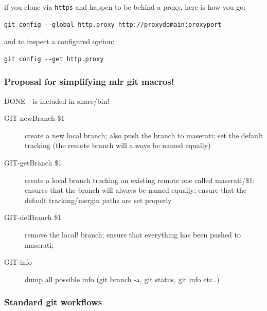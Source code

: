\begin{itemize}
if you clone via \verb+https+ and happen to be behind a proxy, here is how
you go:
\begin{code}\begin{verbatim}
git config --global http.proxy http://proxydomain:proxyport
\end{verbatim} \end{code}
and to inspect a configured option:
\begin{code}\begin{verbatim}
git config --get http.proxy
\end{verbatim} \end{code}

\end{itemize}

\subsubsection{Proposal for simplifying mlr git macros!}

DONE - is included in share/bin!

\begin{description}
\item[GIT-newBranch \$1]

create a new local branch; also push the branch to maserati; set the
default tracking (the remote branch will always be named equally)

\item[GIT-getBranch \$1]

create a local branch tracking an existing remote one called
maserati/\$1; ensures that the branch will always be named equally;
ensure that the default tracking/mergin paths are set properly

\item[GIT-delBranch \$1]

remove the local! branch; ensure that everything has been pushed to
maserati;

\item[GIT-info]

dump all possible info (git branch -a, git status, git info etc..)

\end{description}






\subsubsection{Standard git workflows}


